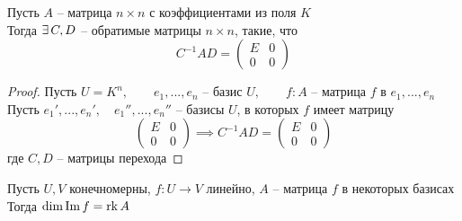 \begin{implication}
	Пусть $ A $ -- матрица $ n \times n $ с коэффициентами из поля $ K $ \\
    Тогда $ \exists\, C, D $ -- обратимые матрицы $ n \times n $, такие, что
    $$ C^{-1} A D =
    \begin{pmatrix}
    	E & 0 \\
        0 & 0
    \end{pmatrix} $$
\end{implication}

\begin{proof}
	Пусть $ U = K^n, \qquad e_1, ..., e_n $ -- базис $ U, \qquad f : A $ -- матрица $ f $ в $ e_1, ..., e_n $ \\
    Пусть $ e_1', ..., e_n', \quad e_1'', ..., e_n'' $ -- базисы $ U $, в которых $ f $ имеет матрицу
    $$
    \begin{pmatrix}
    	E & 0 \\
        0 & 0
    \end{pmatrix} \implies C^{-1} A D =
    \begin{pmatrix}
    	E & 0 \\
        0 & 0
    \end{pmatrix} $$
    где $ C, D $ -- матрицы перехода
\end{proof}

\begin{theorem}
	Пусть $ U, V $ конечномерны, $ f : U \to V $ линейно, $ A $ -- матрица $ f $ в некоторых базисах \\
    Тогда $ \dim \operatorname{Im} f = \operatorname{rk} A $
\end{theorem}

